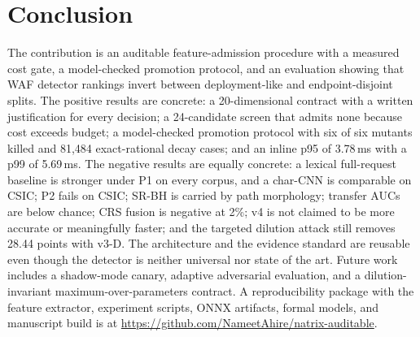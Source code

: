\documentclass[conference]{IEEEtran}
\begin{document}
\section{Conclusion}
The contribution is an auditable feature-admission procedure with a measured cost gate, a model-checked promotion protocol, and an evaluation showing that WAF detector rankings invert between deployment-like and endpoint-disjoint splits. The positive results are concrete: a 20-dimensional contract with a written justification for every decision; a 24-candidate screen that admits none because cost exceeds budget; a model-checked promotion protocol with six of six mutants killed and 81,484 exact-rational decay cases; and an inline p95 of 3.78\,ms with a p99 of 5.69\,ms. The negative results are equally concrete: a lexical full-request baseline is stronger under P1 on every corpus, and a char-CNN is comparable on CSIC; P2 fails on CSIC; SR-BH is carried by path morphology; transfer AUCs are below chance; CRS fusion is negative at 2\%; v4 is not claimed to be more accurate or meaningfully faster; and the targeted dilution attack still removes 28.44 points with v3-D. The architecture and the evidence standard are reusable even though the detector is neither universal nor state of the art. Future work includes a shadow-mode canary, adaptive adversarial evaluation, and a dilution-invariant maximum-over-parameters contract. A reproducibility package with the feature extractor, experiment scripts, ONNX artifacts, formal models, and manuscript build is at \url{https://github.com/NameetAhire/natrix-auditable}.



\end{document}
